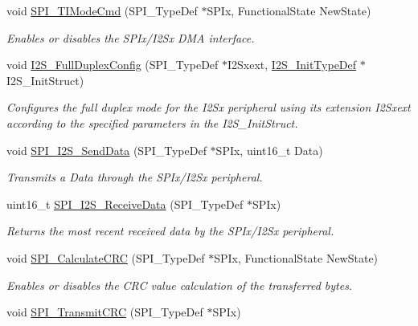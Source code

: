 \begin{DoxyCompactItemize}
void \hyperlink{group___s_p_i_ga74594bf32e3bf4905ac7a2deef8eb475}{S\-P\-I\-\_\-\-T\-I\-Mode\-Cmd} (S\-P\-I\-\_\-\-Type\-Def $\ast$S\-P\-Ix, Functional\-State New\-State)
\begin{DoxyCompactList}\small\item\em Enables or disables the S\-P\-Ix/\-I2\-Sx D\-M\-A interface. \end{DoxyCompactList}\item 
void \hyperlink{group___s_p_i_ga60082947bedfe9efc233405be2a7bec2}{I2\-S\-\_\-\-Full\-Duplex\-Config} (S\-P\-I\-\_\-\-Type\-Def $\ast$I2\-Sxext, \hyperlink{struct_i2_s___init_type_def}{I2\-S\-\_\-\-Init\-Type\-Def} $\ast$I2\-S\-\_\-\-Init\-Struct)
\begin{DoxyCompactList}\small\item\em Configures the full duplex mode for the I2\-Sx peripheral using its extension I2\-Sxext according to the specified parameters in the I2\-S\-\_\-\-Init\-Struct. \end{DoxyCompactList}\item 
void \hyperlink{group___s_p_i_gad5af40bebe8dbe3fa8bd476489d7e3da}{S\-P\-I\-\_\-\-I2\-S\-\_\-\-Send\-Data} (S\-P\-I\-\_\-\-Type\-Def $\ast$S\-P\-Ix, uint16\-\_\-t Data)
\begin{DoxyCompactList}\small\item\em Transmits a Data through the S\-P\-Ix/\-I2\-Sx peripheral. \end{DoxyCompactList}\item 
uint16\-\_\-t \hyperlink{group___s_p_i_gab77de76547f3bff403236b263b070a30}{S\-P\-I\-\_\-\-I2\-S\-\_\-\-Receive\-Data} (S\-P\-I\-\_\-\-Type\-Def $\ast$S\-P\-Ix)
\begin{DoxyCompactList}\small\item\em Returns the most recent received data by the S\-P\-Ix/\-I2\-Sx peripheral. \end{DoxyCompactList}\item 
void \hyperlink{group___s_p_i_ga64f7276d119e6cb58afc100f8832adb0}{S\-P\-I\-\_\-\-Calculate\-C\-R\-C} (S\-P\-I\-\_\-\-Type\-Def $\ast$S\-P\-Ix, Functional\-State New\-State)
\begin{DoxyCompactList}\small\item\em Enables or disables the C\-R\-C value calculation of the transferred bytes. \end{DoxyCompactList}\item 
void \hyperlink{group___s_p_i_gace8b1058e09bab150b0dbe5978810273}{S\-P\-I\-\_\-\-Transmit\-C\-R\-C} (S\-P\-I\-\_\-\-Type\-Def $\ast$S\-P\-Ix)

\end{DoxyCompactItemize}
